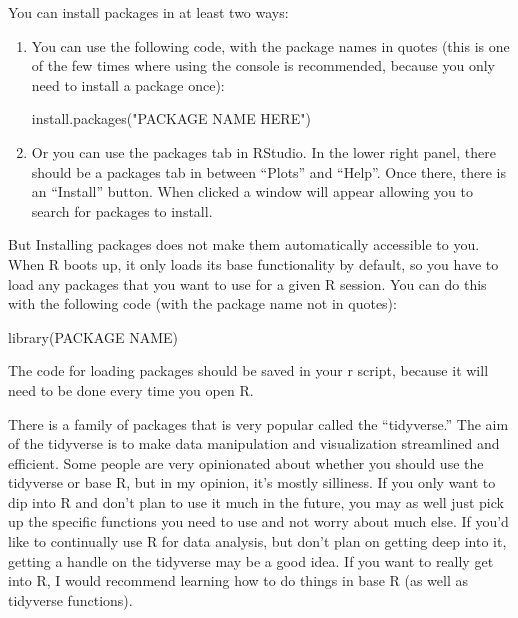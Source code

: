 \documentclass[
  letterpaper,
  DIV=11,
  numbers=noendperiod]{scrreprt}
\newenvironment{Shaded}{\begin{snugshade}}{\end{snugshade}}
\newcommand{\FunctionTok}[1]{\textcolor[rgb]{0.28,0.35,0.67}{#1}}
\newcommand{\NormalTok}[1]{\textcolor[rgb]{0.00,0.23,0.31}{#1}}
\newcommand{\StringTok}[1]{\textcolor[rgb]{0.13,0.47,0.30}{#1}}
\begin{document}
You can install packages in at least two ways:

\begin{enumerate}
\def\labelenumi{\arabic{enumi}.}
\item
  You can use the following code, with the package names in quotes (this
  is one of the few times where using the console is recommended,
  because you only need to install a package once):

\begin{Shaded}
\begin{Highlighting}[]
\FunctionTok{install.packages}\NormalTok{(}\StringTok{"PACKAGE NAME HERE"}\NormalTok{)}
\end{Highlighting}
\end{Shaded}
\item
  Or you can use the packages tab in RStudio. In the lower right panel,
  there should be a packages tab in between ``Plots'' and ``Help''. Once
  there, there is an ``Install'' button. When clicked a window will
  appear allowing you to search for packages to install.
\end{enumerate}

But Installing packages does not make them automatically accessible to
you. When R boots up, it only loads its base functionality by default,
so you have to load any packages that you want to use for a given R
session. You can do this with the following code (with the package name
not in quotes):

\begin{Shaded}
\begin{Highlighting}[]
\FunctionTok{library}\NormalTok{(PACKAGE NAME)}
\end{Highlighting}
\end{Shaded}

The code for loading packages should be saved in your r script, because
it will need to be done every time you open R.

There is a family of packages that is very popular called the
``tidyverse.'' The aim of the tidyverse is to make data manipulation and
visualization streamlined and efficient. Some people are very
opinionated about whether you should use the tidyverse or base R, but in
my opinion, it's mostly silliness. If you only want to dip into R and
don't plan to use it much in the future, you may as well just pick up
the specific functions you need to use and not worry about much else. If
you'd like to continually use R for data analysis, but don't plan on
getting deep into it, getting a handle on the tidyverse may be a good
idea. If you want to really get into R, I would recommend learning how
to do things in base R (as well as tidyverse functions).
\end{document}
